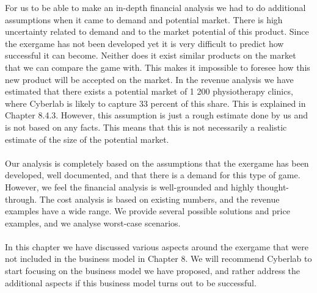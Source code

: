 For us to be able to make an in-depth financial analysis we had to do additional assumptions when it came to demand and potential market. There is high uncertainty related to demand and to the market potential of this product. Since the exergame has not been developed yet it is very difficult to predict how successful it can become. Neither does it exist similar products on the market that we can compare the game with. This makes it impossible to foresee how this new product will be accepted on the market. In the revenue analysis we have estimated that there exists a potential market of 1 200 physiotherapy clinics, where Cyberlab is likely to capture 33 percent of this share. This is explained in Chapter 8.4.3. However, this assumption is just a rough estimate done by us and is not based on any facts. This means that this is not necessarily a realistic estimate of the size of the potential market. \\ \\
Our analysis is completely based on the assumptions that the exergame has been developed, well documented, and that there is a demand for this type of game.  However, we feel the financial analysis is well-grounded and highly thought-through. The cost analysis is based on existing numbers, and the revenue examples have a wide range. We provide several possible solutions and price examples, and we analyse worst-case scenarios.  \\ \\
In this chapter we have discussed various aspects around the exergame that were not included in the business model in Chapter 8. We will recommend Cyberlab to start focusing on the business model we have proposed, and rather address the additional aspects if this business model turns out to be successful. 


